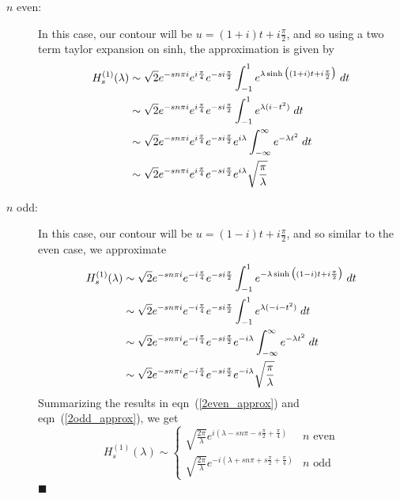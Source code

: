\documentclass[11pt]{article}
\newcommand{\lam}{\lambda}
\newcommand{\eqr}[1]{eqn~(\ref{#1})}
\begin{document}
\begin{description}
\item[\;\;$n$ even:]
In this case, our contour will be $u = (1+i)t + i\frac{\pi}{2}$, and so using a two
term taylor expansion on sinh, the approximation is given by
\begin{align}
\notag
  H_s^{(1)}(\lam) &\sim
  \sqrt{2}
  e^{-sn\pi i}
  e^{i\frac{\pi}{4}}
  e^{-si\frac{\pi}{2}}
  \int_{-1}^1
  e^{
    \lam \sinh\big( (1+i)t + i\frac{\pi}{2} \big)
  }
  \; dt
  \\
  \notag
  &\sim
  \sqrt{2}
  e^{-sn\pi i}
  e^{i\frac{\pi}{4}}
  e^{-si\frac{\pi}{2}}
  \int_{-1}^1
  e^{
    \lam (i - t^2)
  }
  \; dt
  \\
  \notag
  &\sim
  \sqrt{2}
  e^{-sn\pi i}
  e^{i\frac{\pi}{4}}
  e^{-si\frac{\pi}{2}}
  e^{i\lam}
  \int_{-\infty}^\infty
  e^{
    -\lam t^2
  }
  \; dt
  \\
  \label{2even_approx}
  &\sim
  \sqrt{2}
  e^{-sn\pi i}
  e^{i\frac{\pi}{4}}
  e^{-si\frac{\pi}{2}}
  e^{i\lam}
  \sqrt{\frac{\pi}{\lam}}
\end{align}
\item[\;\;$n$ odd:]
In this case, our contour will be $u = (1-i)t + i\frac{\pi}{2}$, and so similar to the
even case, we approximate
\begin{align}
\notag
  H_s^{(1)}(\lam) &\sim
  \sqrt{2}
  e^{-sn\pi i}
  e^{-i\frac{\pi}{4}}
  e^{-si\frac{\pi}{2}}
  \int_{-1}^1
  e^{
    -\lam \sinh\big( (1-i)t + i\frac{\pi}{2} \big)
  }
  \; dt
  \\
  \notag
  &\sim
  \sqrt{2}
  e^{-sn\pi i}
  e^{-i\frac{\pi}{4}}
  e^{-si\frac{\pi}{2}}
  \int_{-1}^1
  e^{
    \lam (-i - t^2)
  }
  \; dt
  \\
  \notag
  &\sim
  \sqrt{2}
  e^{-sn\pi i}
  e^{-i\frac{\pi}{4}}
  e^{-si\frac{\pi}{2}}
  e^{-i\lam}
  \int_{-\infty}^\infty
  e^{
    -\lam t^2
  }
  \; dt
  \\
  \label{2odd_approx}
  &\sim
  \sqrt{2}
  e^{-sn\pi i}
  e^{-i\frac{\pi}{4}}
  e^{-si\frac{\pi}{2}}
  e^{-i\lam}
  \sqrt{\frac{\pi}{\lam}}
\end{align}
Summarizing the results in \eqr{2even_approx} and \eqr{2odd_approx}, we get
$$
H_s^{(1)}(\lam)
\sim
\begin{cases}
  \sqrt{\frac{2\pi}{\lam}}
  e^{i(
   \lam
   - sn\pi
   - s\frac{\pi}{2}
   + \frac{\pi}{4} 
  )}
& n \text{ even}
\\
  \sqrt{\frac{2\pi}{\lam}}
  e^{-i(
   \lam
   + sn\pi
   + s\frac{\pi}{2}
   + \frac{\pi}{4} 
  )}
& n \text{ odd}
\end{cases}
$$
\hfill $\blacksquare$

\end{description}
\end{document}
